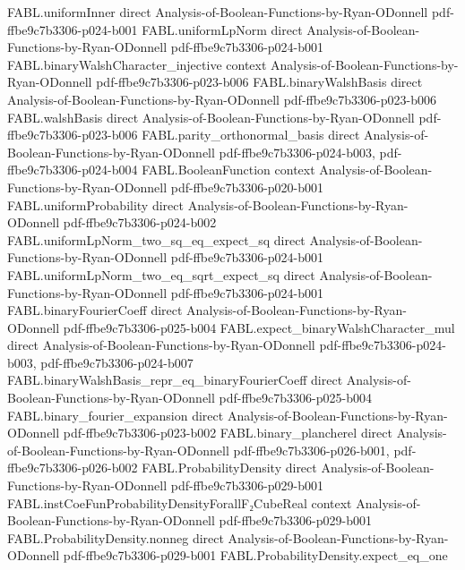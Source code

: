\begin{theorem}
\proofstep
  {FABL.uniformInner}
  {direct}
  {Analysis-of-Boolean-Functions-by-Ryan-ODonnell}
  {pdf-ffbe9c7b3306-p024-b001}
\proofstep
  {FABL.uniformLpNorm}
  {direct}
  {Analysis-of-Boolean-Functions-by-Ryan-ODonnell}
  {pdf-ffbe9c7b3306-p024-b001}
\proofstep
  {FABL.binaryWalshCharacter_injective}
  {context}
  {Analysis-of-Boolean-Functions-by-Ryan-ODonnell}
  {pdf-ffbe9c7b3306-p023-b006}
\proofstep
  {FABL.binaryWalshBasis}
  {direct}
  {Analysis-of-Boolean-Functions-by-Ryan-ODonnell}
  {pdf-ffbe9c7b3306-p023-b006}
\proofstep
  {FABL.walshBasis}
  {direct}
  {Analysis-of-Boolean-Functions-by-Ryan-ODonnell}
  {pdf-ffbe9c7b3306-p023-b006}
\proofstep
  {FABL.parity_orthonormal_basis}
  {direct}
  {Analysis-of-Boolean-Functions-by-Ryan-ODonnell}
  {pdf-ffbe9c7b3306-p024-b003,
    pdf-ffbe9c7b3306-p024-b004}
\proofstep
  {FABL.BooleanFunction}
  {context}
  {Analysis-of-Boolean-Functions-by-Ryan-ODonnell}
  {pdf-ffbe9c7b3306-p020-b001}
\proofstep
  {FABL.uniformProbability}
  {direct}
  {Analysis-of-Boolean-Functions-by-Ryan-ODonnell}
  {pdf-ffbe9c7b3306-p024-b002}
\proofstep
  {FABL.uniformLpNorm_two_sq_eq_expect_sq}
  {direct}
  {Analysis-of-Boolean-Functions-by-Ryan-ODonnell}
  {pdf-ffbe9c7b3306-p024-b001}
\proofstep
  {FABL.uniformLpNorm_two_eq_sqrt_expect_sq}
  {direct}
  {Analysis-of-Boolean-Functions-by-Ryan-ODonnell}
  {pdf-ffbe9c7b3306-p024-b001}
\proofstep
  {FABL.binaryFourierCoeff}
  {direct}
  {Analysis-of-Boolean-Functions-by-Ryan-ODonnell}
  {pdf-ffbe9c7b3306-p025-b004}
\proofstep
  {FABL.expect_binaryWalshCharacter_mul}
  {direct}
  {Analysis-of-Boolean-Functions-by-Ryan-ODonnell}
  {pdf-ffbe9c7b3306-p024-b003,
    pdf-ffbe9c7b3306-p024-b007}
\proofstep
  {FABL.binaryWalshBasis_repr_eq_binaryFourierCoeff}
  {direct}
  {Analysis-of-Boolean-Functions-by-Ryan-ODonnell}
  {pdf-ffbe9c7b3306-p025-b004}
\proofstep
  {FABL.binary_fourier_expansion}
  {direct}
  {Analysis-of-Boolean-Functions-by-Ryan-ODonnell}
  {pdf-ffbe9c7b3306-p023-b002}
\proofstep
  {FABL.binary_plancherel}
  {direct}
  {Analysis-of-Boolean-Functions-by-Ryan-ODonnell}
  {pdf-ffbe9c7b3306-p026-b001,
    pdf-ffbe9c7b3306-p026-b002}
\proofstep
  {FABL.ProbabilityDensity}
  {direct}
  {Analysis-of-Boolean-Functions-by-Ryan-ODonnell}
  {pdf-ffbe9c7b3306-p029-b001}
\proofstep
  {FABL.instCoeFunProbabilityDensityForallF₂CubeReal}
  {context}
  {Analysis-of-Boolean-Functions-by-Ryan-ODonnell}
  {pdf-ffbe9c7b3306-p029-b001}
\proofstep
  {FABL.ProbabilityDensity.nonneg}
  {direct}
  {Analysis-of-Boolean-Functions-by-Ryan-ODonnell}
  {pdf-ffbe9c7b3306-p029-b001}
\proofstep
  {FABL.ProbabilityDensity.expect_eq_one}

\end{theorem}
